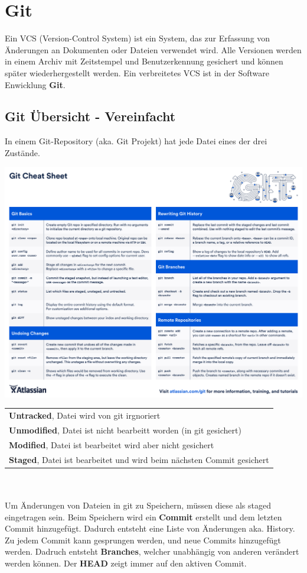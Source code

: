 \section{Git}
Ein VCS (Version-Control System) ist ein System, das zur Erfassung von Änderungen an Dokumenten oder Dateien verwendet wird. Alle Versionen werden in einem Archiv mit Zeitstempel und Benutzerkennung gesichert und können später wiederhergestellt werden. Ein verbreitetes VCS ist in der Software Enwicklung \textbf{Git}.

\subsection{Git Übersicht - Vereinfacht}
In einem Git-Repository (aka. Git Projekt) hat jede Datei eines der drei Zustände.\\
\begin{center}
	\includegraphics[width=\columnwidth]{Images/git}
\end{center}
\begin{tabular}{p{9cm}}
	\textbf{Untracked}, Datei wird von git irgnoriert \\
	\textbf{Unmodified}, Datei ist nicht bearbeitt worden (in git gesichert)\\
	\textbf{Modified}, Datei ist bearbeitet wird aber nicht gesichert\\
	\textbf{Staged}, Datei ist bearbeitet und wird beim nächsten Commit gesichert
\end{tabular}
~\\~\\
Um Änderungen von Dateien in git zu Speichern, müssen diese als staged eingetragen sein. Beim Speichern wird ein \textbf{Commit} erstellt und dem letzten Commit hinzugefügt. Dadurch entsteht eine Liste von Änderungen aka. History. Zu jedem Commit kann gesprungen werden, und neue Commits hinzugefügt werden. Dadruch entsteht \textbf{Branches}, welcher unabhängig von anderen verändert werden können. Der \textbf{HEAD} zeigt immer auf den aktiven Commit.
